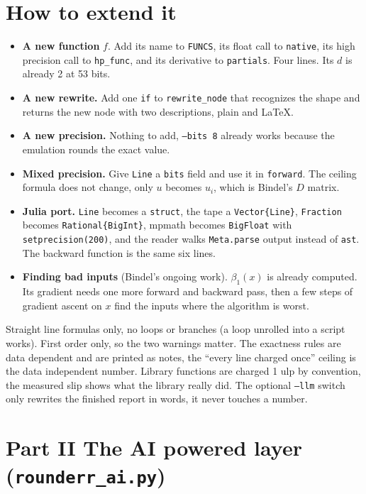 \documentclass[11pt]{article}
\begin{document}
\section{How to extend it}
\begin{itemize}
\item \textbf{A new function} $f$. Add its name to \texttt{FUNCS}, its float call to \texttt{native}, its high precision call to \texttt{hp\_func}, and its derivative to \texttt{partials}. Four lines. Its $d$ is already 2 at 53 bits.
\item \textbf{A new rewrite.} Add one \texttt{if} to \texttt{rewrite\_node} that recognizes the shape and returns the new node with two descriptions, plain and LaTeX.
\item \textbf{A new precision.} Nothing to add, \texttt{--bits 8} already works because the emulation rounds the exact value.
\item \textbf{Mixed precision.} Give \texttt{Line} a \texttt{bits} field and use it in \texttt{forward}. The ceiling formula does not change, only $u$ becomes $u_i$, which is Bindel's $D$ matrix.
\item \textbf{Julia port.} \texttt{Line} becomes a \texttt{struct}, the tape a \texttt{Vector\{Line\}}, \texttt{Fraction} becomes \texttt{Rational\{BigInt\}}, mpmath becomes \texttt{BigFloat} with \texttt{setprecision(200)}, and the reader walks \texttt{Meta.parse} output instead of \texttt{ast}. The backward function is the same six lines.
\item \textbf{Finding bad inputs} (Bindel's ongoing work). $\beta_1(x)$ is already computed. Its gradient needs one more forward and backward pass, then a few steps of gradient ascent on $x$ find the inputs where the algorithm is worst.
\end{itemize}

\begin{trap}
Straight line formulas only, no loops or branches (a loop unrolled into a script works). First order only, so the two warnings matter. The exactness rules are data dependent and are printed as notes, the ``every line charged once'' ceiling is the data independent number. Library functions are charged 1 ulp by convention, the measured slip shows what the library really did. The optional \texttt{--llm} switch only rewrites the finished report in words, it never touches a number.
\end{trap}


\clearpage
\section*{Part II \quad The AI powered layer (\texttt{rounderr\_ai.py})}
\end{document}
